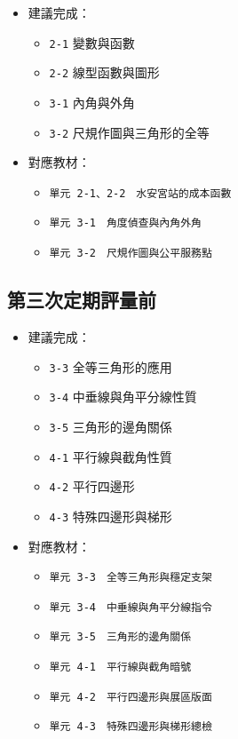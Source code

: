 \documentclass[
  chinese,
  12pt,
  a4paper,
  oneside]{article}
\providecommand{\tightlist}{%
  \setlength{\itemsep}{0pt}\setlength{\parskip}{0pt}}
\begin{document}
\begin{itemize}
\tightlist
\item
  建議完成：

  \begin{itemize}
  \tightlist
  \item
    \texttt{2-1} 變數與函數
  \item
    \texttt{2-2} 線型函數與圖形
  \item
    \texttt{3-1} 內角與外角
  \item
    \texttt{3-2} 尺規作圖與三角形的全等
  \end{itemize}
\item
  對應教材：

  \begin{itemize}
  \tightlist
  \item
    \texttt{單元\ 2-1、2-2　水安宮站的成本函數}
  \item
    \texttt{單元\ 3-1　角度偵查與內角外角}
  \item
    \texttt{單元\ 3-2　尺規作圖與公平服務點}
  \end{itemize}
\end{itemize}

\subsection{第三次定期評量前}\label{ux7b2cux4e09ux6b21ux5b9aux671fux8a55ux91cfux524d}

\begin{itemize}
\tightlist
\item
  建議完成：

  \begin{itemize}
  \tightlist
  \item
    \texttt{3-3} 全等三角形的應用
  \item
    \texttt{3-4} 中垂線與角平分線性質
  \item
    \texttt{3-5} 三角形的邊角關係
  \item
    \texttt{4-1} 平行線與截角性質
  \item
    \texttt{4-2} 平行四邊形
  \item
    \texttt{4-3} 特殊四邊形與梯形
  \end{itemize}
\item
  對應教材：

  \begin{itemize}
  \tightlist
  \item
    \texttt{單元\ 3-3　全等三角形與穩定支架}
  \item
    \texttt{單元\ 3-4　中垂線與角平分線指令}
  \item
    \texttt{單元\ 3-5　三角形的邊角關係}
  \item
    \texttt{單元\ 4-1　平行線與截角暗號}
  \item
    \texttt{單元\ 4-2　平行四邊形與展區版面}
  \item
    \texttt{單元\ 4-3　特殊四邊形與梯形總檢}
  \end{itemize}
\end{itemize}
\end{document}
